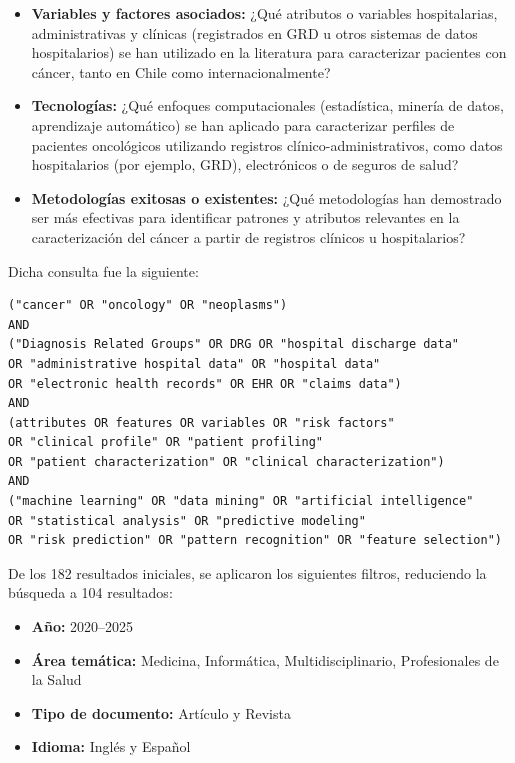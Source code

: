 \begin{itemize}
    \item \textbf{Variables y factores asociados:} ¿Qué atributos o variables hospitalarias, administrativas y clínicas (registrados en GRD u otros sistemas de datos hospitalarios) se han utilizado en la literatura para caracterizar pacientes con cáncer, tanto en Chile como internacionalmente?
    
    \item \textbf{Tecnologías:} ¿Qué enfoques computacionales (estadística, minería de datos, aprendizaje automático) se han aplicado para caracterizar perfiles de pacientes oncológicos utilizando registros clínico-administrativos, como datos hospitalarios (por ejemplo, GRD), electrónicos o de seguros de salud?
    
    \item \textbf{Metodologías exitosas o existentes:} ¿Qué metodologías han demostrado ser más efectivas para identificar patrones y atributos relevantes en la caracterización del cáncer a partir de registros clínicos u hospitalarios?
\end{itemize}

Dicha consulta fue la siguiente:

\begin{lstlisting}[style=query]
("cancer" OR "oncology" OR "neoplasms")
AND
("Diagnosis Related Groups" OR DRG OR "hospital discharge data" 
OR "administrative hospital data" OR "hospital data" 
OR "electronic health records" OR EHR OR "claims data")
AND
(attributes OR features OR variables OR "risk factors" 
OR "clinical profile" OR "patient profiling" 
OR "patient characterization" OR "clinical characterization")
AND
("machine learning" OR "data mining" OR "artificial intelligence" 
OR "statistical analysis" OR "predictive modeling" 
OR "risk prediction" OR "pattern recognition" OR "feature selection")
\end{lstlisting}

De los 182 resultados iniciales, se aplicaron los siguientes filtros, reduciendo la búsqueda a 104 resultados:
\begin{itemize}
    \item \textbf{Año:} 2020--2025
    \item \textbf{Área temática:} Medicina, Informática, Multidisciplinario, Profesionales de la Salud
    \item \textbf{Tipo de documento:} Artículo y Revista
    \item \textbf{Idioma:} Inglés y Español
\end{itemize}

